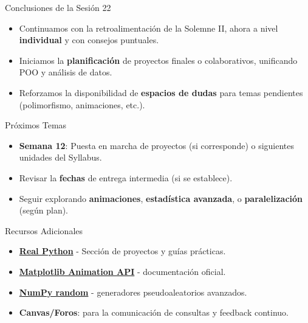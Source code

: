 \documentclass[10pt]{beamer}
\begin{document}
\begin{frame}{Conclusiones de la Sesión 22}
  \begin{itemize}
    \item Continuamos con la retroalimentación de la Solemne II, ahora a nivel \textbf{individual} y con consejos puntuales.
    \item Iniciamos la \textbf{planificación} de proyectos finales o colaborativos, unificando POO y análisis de datos.
    \item Reforzamos la disponibilidad de \textbf{espacios de dudas} para temas pendientes (polimorfismo, animaciones, etc.).
  \end{itemize}
\end{frame}

\begin{frame}{Próximos Temas}
  \begin{itemize}
    \item \textbf{Semana 12}: Puesta en marcha de proyectos (si corresponde) o siguientes unidades del Syllabus.
    \item Revisar la \textbf{fechas} de entrega intermedia (si se establece).
    \item Seguir explorando \textbf{animaciones}, \textbf{estadística avanzada}, o \textbf{paralelización} (según plan).
  \end{itemize}
\end{frame}

\begin{frame}{Recursos Adicionales}
  \begin{itemize}
    \item \href{https://realpython.com/courses/}{\textbf{Real Python}} - Sección de proyectos y guías prácticas.
    \item \href{https://matplotlib.org/stable/api/animation_api.html}{\textbf{Matplotlib Animation API}} - documentación oficial.
    \item \href{https://numpy.org/doc/stable/reference/routines.random.html}{\textbf{NumPy random}} - generadores pseudoaleatorios avanzados.
    \item \textbf{Canvas/Foros}: para la comunicación de consultas y feedback continuo.
  \end{itemize}
\end{frame}
\end{document}
